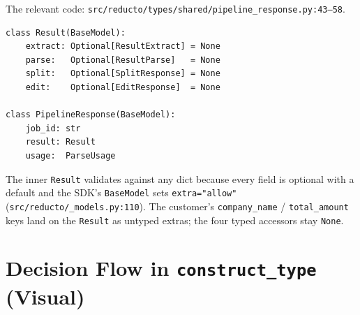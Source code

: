 \documentclass[11pt]{article}
\begin{document}
The relevant code: \texttt{src/reducto/types/shared/pipeline\_response.py:43--58}.

\begin{lstlisting}[style=py]
class Result(BaseModel):
    extract: Optional[ResultExtract] = None
    parse:   Optional[ResultParse]   = None
    split:   Optional[SplitResponse] = None
    edit:    Optional[EditResponse]  = None

class PipelineResponse(BaseModel):
    job_id: str
    result: Result
    usage:  ParseUsage
\end{lstlisting}

The inner \texttt{Result} validates against any dict because every field is optional with a default and the SDK's \texttt{BaseModel} sets \texttt{extra="allow"} (\texttt{src/reducto/\_models.py:110}). The customer's \texttt{company\_name} / \texttt{total\_amount} keys land on the \texttt{Result} as untyped extras; the four typed accessors stay \texttt{None}.

\section{Decision Flow in \texttt{construct\_type} (Visual)}
\end{document}

